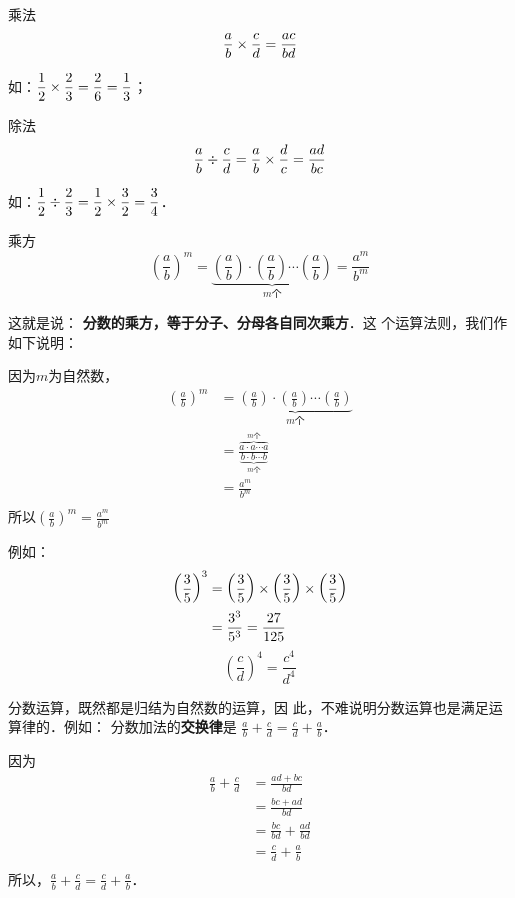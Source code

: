 \begin{blk}{乘法}
	\[\dfrac{a}{b}\times\dfrac{c}{d}=\dfrac{ac}{bd}\]
\end{blk}

如：$\dfrac{1}{2}\times\dfrac{2}{3}=\dfrac{2}{6}=\dfrac{1}{3}$；

\begin{blk}{除法}
	\[\dfrac{a}{b}\div \dfrac{c}{d}=\dfrac{a}{b}\times\dfrac{d}{c}=\dfrac{ad}{bc}\]
\end{blk}

如：$\dfrac{1}{2}\div\dfrac{2}{3}=\dfrac{1}{2}\times \dfrac{3}{2}=\dfrac{3}{4}$．

\begin{blk}{乘方}
	\[\left(\frac{a}{b}\right)^m=\underbrace{\left(\frac{a}{b}\right)\cdot \left(\frac{a}{b}\right)\cdots \left(\frac{a}{b}\right)}_{\text{$m$个}}=\frac{a^m}{b^m}\]
\end{blk}

这就是说：
\textbf{分数的乘方，等于分子、分母各自同次乘方}．这
个运算法则，我们作如下说明：

\begin{note}
	因为$m$为自然数，
	\begin{align*}
	\left(\frac{a}{b}\right)^m&=\underbrace{\left(\frac{a}{b}\right)\cdot \left(\frac{a}{b}\right)\cdots \left(\frac{a}{b}\right)}_{\text{$m$个}}
	\tag{乘方的意义}\\
	&=\frac{\overbrace{a\cdot a\cdots a}^{\text{$m$个}}}{\underbrace{b\cdot b\cdots b}_{\text{$m$个}}} \tag{分数乘法法则}\\
	&= \frac{a^m}{b^m}\tag{乘方的意义}\\
	\end{align*}
	所以$\left(\frac{a}{b}\right)^m=\frac{a^m}{b^m}$
\end{note}

例如：
\[ \begin{split}
\left(\dfrac{3}{5}\right)^3&=\left(\dfrac{3}{5}\right)\times \left(\dfrac{3}{5}\right)\times \left(\dfrac{3}{5}\right)\\
&=\dfrac{3^3}{5^3}=\dfrac{27}{125}
\end{split} \]
\[ \left(\frac{c}{d}\right)^4=\frac{c^4}{d^4} \]

分数运算，既然都是归结为自然数的运算，因
此，不难说明分数运算也是满足运算律的．例如：
分数加法的\textbf{交换律}是
$\frac{a}{b}+\frac{c}{d}=\frac{c}{d}+\frac{a}{b}$．

\begin{note}
	因为
	\begin{align*}
	\frac{a}{b}+\frac{c}{d}&=\frac{ad+bc}{bd} \tag{分数加法法则}\\
	&=\frac{bc+ad}{bd}\tag{自然数加法交换律}\\
	&=\frac{bc}{bd}+\frac{ad}{bd}\\
	&=\frac{c}{d}+\frac{a}{b}\tag{分数的基本性质}\\
	\end{align*}
	所以，$\frac{a}{b}+\frac{c}{d}=\frac{c}{d}+\frac{a}{b}$．
\end{note}

